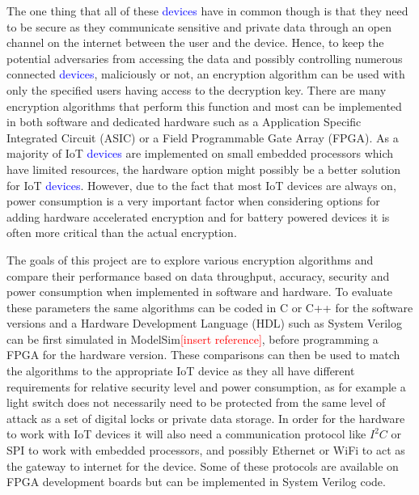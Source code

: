 \documentclass[12pt,twoside,a4paper]{report}
\begin{document}
    The one thing that all of these \textcolor{blue}{devices} have in common though is that they need to be secure as they communicate sensitive and private data through an open channel on the internet between the user and the device. Hence, to keep the potential adversaries from accessing the data and possibly controlling numerous connected \textcolor{blue}{devices}, maliciously or not, an encryption algorithm can be used with only the specified users having access to the decryption key. There are many encryption algorithms that perform this function and most can be implemented in both software and dedicated hardware such as a Application Specific Integrated Circuit (ASIC) or a Field Programmable Gate Array (FPGA). As a majority of IoT \textcolor{blue}{devices} are implemented on small embedded processors which have limited resources, the hardware option might possibly be a better solution for IoT \textcolor{blue}{devices}. 
    However, due to the fact that most IoT devices are always on, power consumption is a very important factor when considering options for adding hardware accelerated encryption and for battery powered devices it is often more critical than the actual encryption.
    
    The goals of this project are to explore various encryption algorithms and compare their performance based on data throughput, accuracy, security and power consumption when implemented in software and hardware. To evaluate these parameters the same algorithms can be coded in C or C++ for the software versions and a Hardware Development Language (HDL) such as System Verilog can be first simulated in ModelSim\textcolor{red}{[insert reference]}, before programming a FPGA for the hardware version. These comparisons can then be used to match the algorithms to the appropriate IoT device as they all have different requirements for relative security level and power consumption, as for example a light switch does not necessarily need to be protected from the same level of attack as a set of digital locks or private data storage. In order for the hardware to work with IoT devices it will also need a communication protocol like $I^2 C$ or SPI to work with embedded processors, and possibly Ethernet or WiFi to act as the gateway to internet for the device. Some of these protocols are available on FPGA development boards but can be implemented in System Verilog code.
    
    
\end{document}

